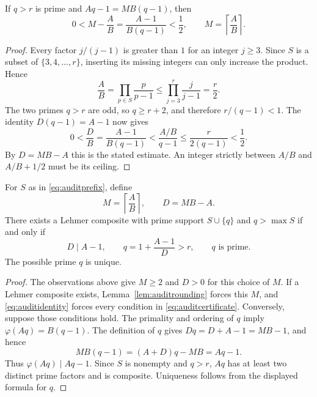 \begin{lemma}\label{lem:auditrounding}
If $q>r$ is prime and $Aq-1=MB(q-1)$, then
\begin{equation}\label{eq:auditrounding}
 0<M-\frac AB=\frac{A-1}{B(q-1)}<\frac12,
 \qquad M=\left\lceil\frac AB\right\rceil.
\end{equation}
\end{lemma}
\begin{proof}
Every factor $j/(j-1)$ is greater than $1$ for an integer $j\ge3$.
Since $S$ is a subset of $\{3,4,\ldots,r\}$, inserting its missing
integers can only increase the product. Hence
\[
 \frac AB=\prod_{p\in S}\frac p{p-1}
 \le\prod_{j=3}^{r}\frac j{j-1}=\frac r2.
\]
The two primes $q>r$ are odd, so $q\ge r+2$, and therefore
$r/(q-1)<1$. The identity $D(q-1)=A-1$ now gives
\[
 0<\frac DB=\frac{A-1}{B(q-1)}
 <\frac{A/B}{q-1}\le\frac{r}{2(q-1)}<\frac12.
\]
By $D=MB-A$ this is the stated estimate. An integer strictly between
$A/B$ and $A/B+1/2$ must be its ceiling.
\end{proof}

\begin{theorem}\label{thm:auditcriterion}
For $S$ as in \eqref{eq:auditprefix}, define
\[
 M=\left\lceil\frac AB\right\rceil,\qquad D=MB-A.
\]
There exists a Lehmer composite with prime support $S\cup\{q\}$ and
$q>\max S$ if and only if
\begin{equation}\label{eq:auditcertificate}
 D\mid A-1,\qquad
 q=1+\frac{A-1}{D}>r,\qquad q\text{ is prime}.
\end{equation}
The possible prime $q$ is unique.
\end{theorem}
\begin{proof}
The observations above give $M\ge2$ and $D>0$ for this choice of
$M$. If a Lehmer composite exists, Lemma~\ref{lem:auditrounding}
forces this $M$, and \eqref{eq:auditidentity} forces every condition
in \eqref{eq:auditcertificate}. Conversely, suppose those conditions
hold. The primality and ordering of $q$ imply
$\varphi(Aq)=B(q-1)$. The definition of $q$ gives
$Dq=D+A-1=MB-1$, and hence
\[
 MB(q-1)=(A+D)q-MB=Aq-1.
\]
Thus $\varphi(Aq)\mid Aq-1$. Since $S$ is nonempty and $q>r$,
$Aq$ has at least two distinct prime factors and is composite.
Uniqueness follows from the displayed formula for $q$.
\end{proof}

